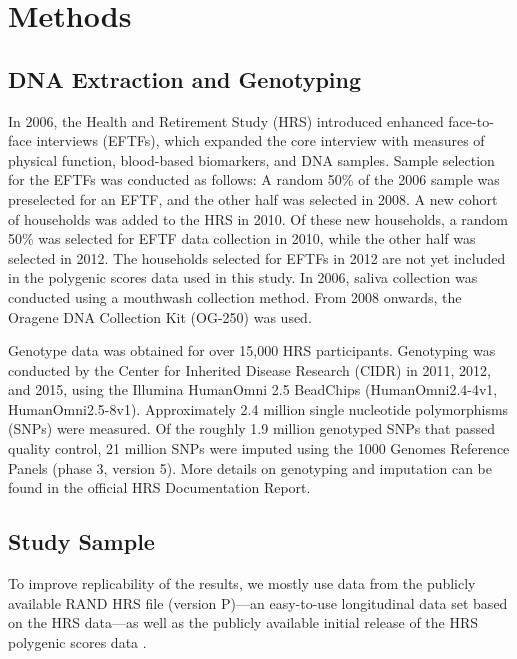 \section{Methods}

\subsection{DNA Extraction and Genotyping}
\label{supsec:dna_genotyping}
\noindent In 2006, the Health and Retirement Study (HRS) introduced enhanced face-to-face interviews (EFTFs), which expanded the core interview with measures of physical function, blood-based biomarkers, and DNA samples. Sample selection for the EFTFs was conducted as follows: A random 50\% of the 2006 sample was preselected for an EFTF, and the other half was selected in 2008. A new cohort of households was added to the HRS in 2010. Of these new households, a random 50\% was selected  for EFTF data collection in 2010, while the other half was selected in 2012. The households selected for EFTFs in 2012 are not yet included in the polygenic scores data used in this study. In 2006, saliva collection was conducted using a mouthwash collection method. From 2008 onwards, the Oragene DNA Collection Kit (OG-250) was used.%

Genotype data was obtained for over 15,000 HRS participants. Genotyping was conducted by the Center for Inherited Disease Research (CIDR) in 2011, 2012, and 2015, using the Illumina HumanOmni 2.5 BeadChips (HumanOmni2.4-4v1, HumanOmni2.5-8v1). Approximately 2.4 million single nucleotide polymorphisms (SNPs) were measured. Of the roughly 1.9 million genotyped SNPs that passed quality control, 21 million SNPs were imputed using the 1000 Genomes Reference Panels (phase 3, version 5). More details on genotyping and imputation can be found in the official HRS Documentation Report.%
\\

\subsection{Study Sample}
\label{supsec:study_sample}

To improve replicability of the results, we mostly use data from the publicly available RAND HRS file (version P)\citep{HRSRAND}---an easy-to-use longitudinal data set based on the HRS data---as well as the publicly available initial release of the HRS polygenic scores data \citep{HRSPGENSCORE}.

